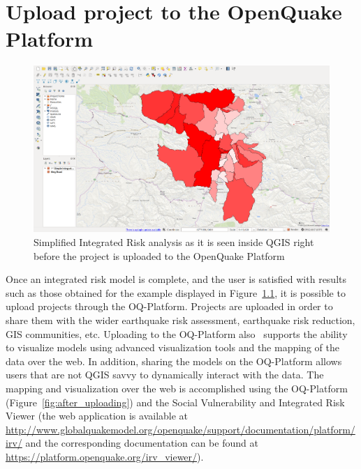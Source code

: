 \chapter{Upload project to the OpenQuake Platform}

\begin{figure}
    \centering
    \includegraphics[width=\textwidth]{../images/image22}
    \caption{Simplified Integrated Risk analysis as it is seen inside QGIS
    right before the project is uploaded to the OpenQuake Platform}
    \label{fig:before_uploading}
\end{figure}

Once an integrated risk model is complete, and the user is satisfied with
results such as those obtained for the example displayed in
Figure~\ref{fig:before_uploading}, it is possible to upload projects through
the OQ-Platform. Projects are uploaded in order to share them with the wider
earthquake risk assessment, earthquake risk reduction, GIS communities, etc.
Uploading to the OQ-Platform also  supports the ability to visualize models
using advanced visualization tools and the mapping of the data over the web. In
addition, sharing the models on the OQ-Platform allows users that are not QGIS
savvy to dynamically interact with the data. The mapping and visualization over
the web is accomplished using the OQ-Platform
(Figure~\ref{fig:after_uploading}) and the Social Vulnerability and Integrated
Risk Viewer (the web application is available at
\url{http://www.globalquakemodel.org/openquake/support/documentation/platform/irv/}
and the corresponding documentation can be found at
\url{https://platform.openquake.org/irv_viewer/}).

